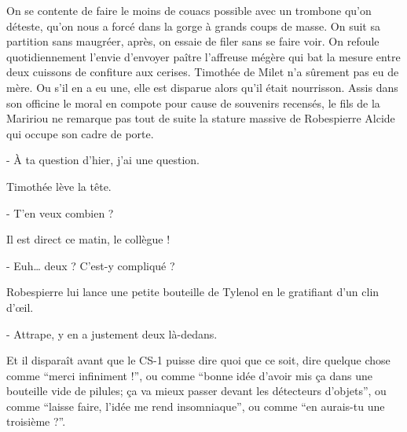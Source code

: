 
On se contente de faire le moins de couacs possible avec un trombone qu’on déteste, qu’on nous a forcé dans la gorge à grands coups de masse. On suit sa partition sans maugréer, après, on essaie de filer sans se faire voir. On refoule quotidiennement l’envie d’envoyer paître l’affreuse mégère qui bat la mesure entre deux cuissons de confiture aux cerises. Timothée de Milet n’a sûrement pas eu de mère. Ou s’il en a eu une, elle est disparue alors qu’il était nourrisson. Assis dans son officine le moral en compote pour cause de souvenirs recensés, le fils de la Maririou ne remarque pas tout de suite la stature massive de Robespierre Alcide qui occupe son cadre de porte.

- À ta question d’hier, j’ai une question.

Timothée lève la tête.

- T’en veux combien ?

Il est direct ce matin, le collègue !

- Euh… deux ? C’est-y compliqué ?

Robespierre lui lance une petite bouteille de Tylenol en le gratifiant d’un clin d’œil.

- Attrape, y en a justement deux là-dedans.

Et il disparaît avant que le CS-1 puisse dire quoi que ce soit, dire quelque chose comme “merci infiniment !”, ou comme “bonne idée d’avoir mis ça dans une bouteille vide de pilules; ça va mieux passer devant les détecteurs d’objets”, ou comme “laisse faire, l’idée me rend insomniaque”, ou comme “en aurais-tu une troisième ?”.

